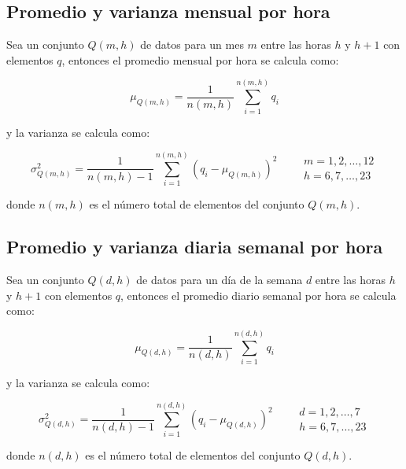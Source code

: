 \subsection{Promedio y varianza mensual por hora}

Sea un conjunto $Q(m,h)$ de datos para un mes $m$  entre las horas $h$ y $h+1$ con elementos $q$, entonces el promedio mensual por hora se calcula como:

\begin{equation}
    \mu_{Q(m,h)} = \frac{1}{n(m,h)} \sum_{i=1}^{n(m,h)} q_i \label{eq:monthly_hourly_mean}
\end{equation}

y la varianza se calcula como:

\begin{equation}
    \sigma^2_{Q(m,h)} = \frac{1}{n(m,h)-1} \sum_{i=1}^{n(m,h)} (q_i - \mu_{Q(m,h)})^2 \qquad \begin{matrix}
        m=1,2,\dots,12 \\
        h=6,7,\dots,23
    \end{matrix} \label{eq:monthly_hourly_var}
\end{equation}

donde $n(m,h)$ es el número total de elementos del conjunto $Q(m,h)$.

\subsection{Promedio y varianza diaria semanal por hora}

Sea un conjunto $Q(d,h)$ de datos para un día de la semana $d$  entre las horas $h$ y $h+1$ con elementos $q$, entonces el promedio diario semanal por hora se calcula como:

\begin{equation}
    \mu_{Q(d,h)} = \frac{1}{n(d,h)} \sum_{i=1}^{n(d,h)} q_i \label{eq:daily_hourly_mean}
\end{equation}

y la varianza se calcula como:

\begin{equation}
    \sigma^2_{Q(d,h)} = \frac{1}{n(d,h)-1} \sum_{i=1}^{n(d,h)} (q_i - \mu_{Q(d,h)})^2 \qquad \begin{matrix}
        d=1,2,\dots,7 \\
        h=6,7,\dots,23
    \end{matrix} \label{eq:daily_hourly_var}
\end{equation}

donde $n(d,h)$ es el número total de elementos del conjunto $Q(d,h)$.